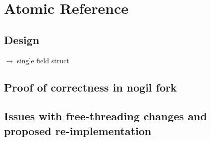\chapter{Atomic Reference}\label{ch:atomic-reference}


\section{Design}\label{sec:design}

$\rightarrow$ single field struct


\section{Proof of correctness in nogil fork}\label{sec:proof-of-correctness-in-nogil-fork}


\section{Issues with free-threading changes and proposed re-implementation}\label{sec:issues-with-free-threading-changes-and-proposed-re-implementation}
